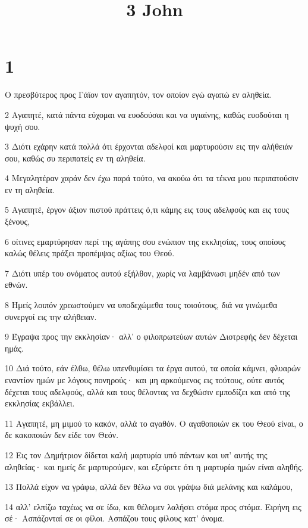 

\title{3 John}


\chapter{1}

\par Ο πρεσβύτερος προς Γάϊον τον αγαπητόν, τον οποίον εγώ αγαπώ εν αληθεία.
\par 2 Αγαπητέ, κατά πάντα εύχομαι να ευοδούσαι και να υγιαίνης, καθώς ευοδούται η ψυχή σου.
\par 3 Διότι εχάρην κατά πολλά ότι έρχονται αδελφοί και μαρτυρούσιν εις την αλήθειάν σου, καθώς συ περιπατείς εν τη αληθεία.
\par 4 Μεγαλητέραν χαράν δεν έχω παρά τούτο, να ακούω ότι τα τέκνα μου περιπατούσιν εν τη αληθεία.
\par 5 Αγαπητέ, έργον άξιον πιστού πράττεις ό,τι κάμης εις τους αδελφούς και εις τους ξένους,
\par 6 οίτινες εμαρτύρησαν περί της αγάπης σου ενώπιον της εκκλησίας, τους οποίους καλώς θέλεις πράξει προπέμψας αξίως του Θεού.
\par 7 Διότι υπέρ του ονόματος αυτού εξήλθον, χωρίς να λαμβάνωσι μηδέν από των εθνών.
\par 8 Ημείς λοιπόν χρεωστούμεν να υποδεχώμεθα τους τοιούτους, διά να γινώμεθα συνεργοί εις την αλήθειαν.
\par 9 Έγραψα προς την εκκλησίαν· αλλ' ο φιλοπρωτεύων αυτών Διοτρεφής δεν δέχεται ημάς.
\par 10 Διά τούτο, εάν έλθω, θέλω υπενθυμίσει τα έργα αυτού, τα οποία κάμνει, φλυαρών εναντίον ημών με λόγους πονηρούς· και μη αρκούμενος εις τούτους, ούτε αυτός δέχεται τους αδελφούς, αλλά και τους θέλοντας να δεχθώσιν εμποδίζει και από της εκκλησίας εκβάλλει.
\par 11 Αγαπητέ, μη μιμού το κακόν, αλλά το αγαθόν. Ο αγαθοποιών εκ του Θεού είναι, ο δε κακοποιών δεν είδε τον Θεόν.
\par 12 Εις τον Δημήτριον δίδεται καλή μαρτυρία υπό πάντων και υπ' αυτής της αληθείας· και ημείς δε μαρτυρούμεν, και εξεύρετε ότι η μαρτυρία ημών είναι αληθής.
\par 13 Πολλά είχον να γράφω, αλλά δεν θέλω να σοι γράψω διά μελάνης και καλάμου,
\par 14 αλλ' ελπίζω ταχέως να σε ίδω, και θέλομεν λαλήσει στόμα προς στόμα. Ειρήνη εις σέ· Ασπάζονταί σε οι φίλοι. Ασπάζου τους φίλους κατ' όνομα.


